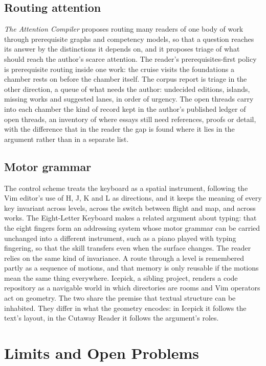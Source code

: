 \documentclass[11pt]{article}
\theoremstyle{remark}
\begin{document}
\subsection{Routing attention}

\emph{The Attention Compiler} proposes routing many readers of one body of work through prerequisite graphs and competency models, so that a question reaches its answer by the distinctions it depends on, and it proposes triage of what should reach the author's scarce attention. The reader's prerequisites-first policy is prerequisite routing inside one work: the cruise visits the foundations a chamber rests on before the chamber itself. The corpus report is triage in the other direction, a queue of what needs the author: undecided editions, islands, missing works and suggested lanes, in order of urgency. The open threads carry into each chamber the kind of record kept in the author's published ledger of open threads, an inventory of where essays still need references, proofs or detail, with the difference that in the reader the gap is found where it lies in the argument rather than in a separate list.

\subsection{Motor grammar}

The control scheme treats the keyboard as a spatial instrument, following the Vim editor's use of H, J, K and L as directions, and it keeps the meaning of every key invariant across levels, across the switch between flight and map, and across works. The Eight-Letter Keyboard makes a related argument about typing: that the eight fingers form an addressing system whose motor grammar can be carried unchanged into a different instrument, such as a piano played with typing fingering, so that the skill transfers even when the surface changes. The reader relies on the same kind of invariance. A route through a level is remembered partly as a sequence of motions, and that memory is only reusable if the motions mean the same thing everywhere. Icepick, a sibling project, renders a code repository as a navigable world in which directories are rooms and Vim operators act on geometry. The two share the premise that textual structure can be inhabited. They differ in what the geometry encodes: in Icepick it follows the text's layout, in the Cutaway Reader it follows the argument's roles.

\section{Limits and Open Problems}
\label{sec:limits}
\end{document}
